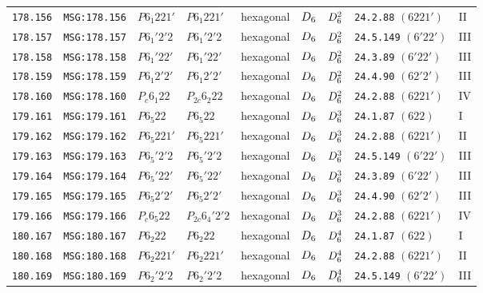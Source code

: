 \documentclass[fleqn,10pt]{jsarticle}
\begin{document}
\begin{center}
\begin{longtable}{lllllllll}
\texttt{178.156} & \texttt{MSG:178.156} & $P6_{1}221'$ & $P6_{1}221'$ & hexagonal & $D_{\rm 6}$ & $D_{\rm 6}^{2}$ & \texttt{24.2.88} $(6221')$ & II \\
\texttt{178.157} & \texttt{MSG:178.157} & $P6_{1}'2'2$ & $P6_{1}'2'2$ & hexagonal & $D_{\rm 6}$ & $D_{\rm 6}^{2}$ & \texttt{24.5.149} $(6'22')$ & III \\
\texttt{178.158} & \texttt{MSG:178.158} & $P6_{1}'22'$ & $P6_{1}'22'$ & hexagonal & $D_{\rm 6}$ & $D_{\rm 6}^{2}$ & \texttt{24.3.89} $(6'22')$ & III \\
\texttt{178.159} & \texttt{MSG:178.159} & $P6_{1}2'2'$ & $P6_{1}2'2'$ & hexagonal & $D_{\rm 6}$ & $D_{\rm 6}^{2}$ & \texttt{24.4.90} $(62'2')$ & III \\
\texttt{178.160} & \texttt{MSG:178.160} & $P_{c}6_{1}22$ & $P_{2c}6_{2}22$ & hexagonal & $D_{\rm 6}$ & $D_{\rm 6}^{2}$ & \texttt{24.2.88} $(6221')$ & IV \\ \hline
\texttt{179.161} & \texttt{MSG:179.161} & $P6_{5}22$ & $P6_{5}22$ & hexagonal & $D_{\rm 6}$ & $D_{\rm 6}^{3}$ & \texttt{24.1.87} $(622)$ & I \\
\texttt{179.162} & \texttt{MSG:179.162} & $P6_{5}221'$ & $P6_{5}221'$ & hexagonal & $D_{\rm 6}$ & $D_{\rm 6}^{3}$ & \texttt{24.2.88} $(6221')$ & II \\
\texttt{179.163} & \texttt{MSG:179.163} & $P6_{5}'2'2$ & $P6_{5}'2'2$ & hexagonal & $D_{\rm 6}$ & $D_{\rm 6}^{3}$ & \texttt{24.5.149} $(6'22')$ & III \\
\texttt{179.164} & \texttt{MSG:179.164} & $P6_{5}'22'$ & $P6_{5}'22'$ & hexagonal & $D_{\rm 6}$ & $D_{\rm 6}^{3}$ & \texttt{24.3.89} $(6'22')$ & III \\
\texttt{179.165} & \texttt{MSG:179.165} & $P6_{5}2'2'$ & $P6_{5}2'2'$ & hexagonal & $D_{\rm 6}$ & $D_{\rm 6}^{3}$ & \texttt{24.4.90} $(62'2')$ & III \\
\texttt{179.166} & \texttt{MSG:179.166} & $P_{c}6_{5}22$ & $P_{2c}6_{4}'2'2$ & hexagonal & $D_{\rm 6}$ & $D_{\rm 6}^{3}$ & \texttt{24.2.88} $(6221')$ & IV \\ \hline
\texttt{180.167} & \texttt{MSG:180.167} & $P6_{2}22$ & $P6_{2}22$ & hexagonal & $D_{\rm 6}$ & $D_{\rm 6}^{4}$ & \texttt{24.1.87} $(622)$ & I \\
\texttt{180.168} & \texttt{MSG:180.168} & $P6_{2}221'$ & $P6_{2}221'$ & hexagonal & $D_{\rm 6}$ & $D_{\rm 6}^{4}$ & \texttt{24.2.88} $(6221')$ & II \\
\texttt{180.169} & \texttt{MSG:180.169} & $P6_{2}'2'2$ & $P6_{2}'2'2$ & hexagonal & $D_{\rm 6}$ & $D_{\rm 6}^{4}$ & \texttt{24.5.149} $(6'22')$ & III \\

\end{longtable}
\end{center}
\end{document}
